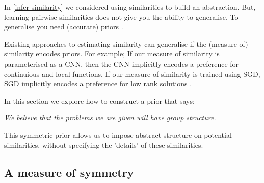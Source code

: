 
In \ref{infer-similarity} we considered using similarities
to build an abstraction. But, learning pairwise similarities does not give
you the ability to generalise\footnotemark[38]. To generalise you need (accurate) priors \cite{Wolpert1996}.


Existing approaches to estimating similarity can generalise if the (measure of) similarity encodes priors.
For example;
If our measure of similarity is parameterised as a CNN, then the CNN implicitly encodes a preference for continuious and local functions\cite{Yann1995}.
If our measure of similarity is trained using SGD, SGD implicitly encodes a preference for low rank solutions \cite{Gunasekar2017}.

In this section we explore how to construct a prior that says:

\begin{displayquote}
	\textsl{We believe that the problems we are given will have group structure.}
\end{displayquote}

This symmetric prior allows us to impose abstract structure on potential similarities, without specifying
the 'details' of these similarities.

%
%
%


\subsection{A measure of symmetry}

